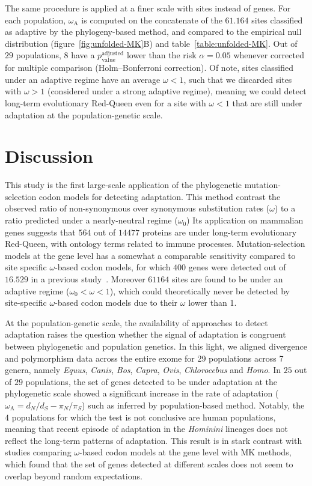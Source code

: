 \documentclass{article}
\newcommand{\dn}{d_N}
\newcommand{\ds}{d_S}
\newcommand{\dnds}{\dn / \ds}
\newcommand{\pn}{\pi_N}
\newcommand{\ps}{\pi_S}
\newcommand{\pnps}{\pn / \ps}
\begin{document}
The same procedure is applied at a finer scale with sites instead of genes.
For each population, $\omega_{\mathrm{A}}$ is computed on the concatenate of the $61.164$ sites classified as adaptive by the phylogeny-based method, and compared to the empirical null distribution (figure~\ref{fig:unfolded-MK}B) and table~\ref{table:unfolded-MK}.
Out of $29$ populations, $8$ have a $p_{\mathrm{value}}^{\mathrm{adjusted}}$ lower than the risk $\alpha=0.05$ whenever corrected for multiple comparison (Holm–Bonferroni correction).
Of note, sites classified under an adaptive regime have an average $\omega < 1$, such that we discarded sites with $\omega > 1$ (considered under a strong adaptive regime), meaning we could detect long-term evolutionary Red-Queen even for a site with $\omega < 1$ that are still under adaptation at the population-genetic scale.

\section*{Discussion}\label{sec:discussion}

This study is the first large-scale application of the phylogenetic mutation-selection codon models for detecting adaptation.
This method contrast the observed ratio of non-synonymous over synonymous substitution rates ($\omega$) to a ratio predicted under a nearly-neutral regime ($\omega_{0}$)
Its application on mammalian genes suggests that $564$ out of $14477$ proteins are under long-term evolutionary Red-Queen, with ontology terms related to immune processes.
Mutation-selection models at the gene level has a somewhat a comparable sensitivity compared to site specific $\omega$-based codon models, for which $400$ genes were detected out of $16.529$ in a previous study~\cite{kosiol_patterns_2008}.
Moreover $61164$ sites are found to be under an adaptive regime ($\omega_{0} < \omega < 1$), which could theoretically never be detected by site-specific $\omega$-based codon models due to their $\omega$ lower than 1.

At the population-genetic scale, the availability of approaches to detect adaptation\cite{mcdonald_adaptative_1991, messer_frequent_2013} raises the question whether the signal of adaptation is congruent between phylogenetic and population genetics.
In this light, we aligned divergence and polymorphism data across the entire exome for 29 populations across 7 genera, namely \textit{Equus}, \textit{Canis}, \textit{Bos}, \textit{Capra}, \textit{Ovis}, \textit{Chlorocebus} and \textit{Homo}.
In $25$ out of $29$ populations, the set of genes detected to be under adaptation at the phylogenetic scale showed a significant increase in the rate of adaptation ($\omega_{\mathrm{A}} = \dnds - \pnps$) such as inferred by population-based method.
Notably, the $4$ populations for which the test is not conclusive are human populations, meaning that recent episode of adaptation in the \textit{Hominini} lineages does not reflect the long-term patterns of adaptation.
This result is in stark contrast with studies comparing $\omega$-based codon models at the gene level with MK methods, which found that the set of genes detected at different scales does not seem to overlap beyond random expectations\cite{chen_two_2021}.
\end{document}
